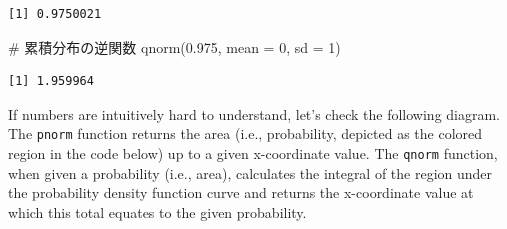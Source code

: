 \documentclass[
  a4paper,
]{book}
\newenvironment{Shaded}{\begin{snugshade}}{\end{snugshade}}
\newcommand{\AttributeTok}[1]{\textcolor[rgb]{0.40,0.45,0.13}{#1}}
\newcommand{\CommentTok}[1]{\textcolor[rgb]{0.37,0.37,0.37}{#1}}
\newcommand{\DecValTok}[1]{\textcolor[rgb]{0.68,0.00,0.00}{#1}}
\newcommand{\FloatTok}[1]{\textcolor[rgb]{0.68,0.00,0.00}{#1}}
\newcommand{\FunctionTok}[1]{\textcolor[rgb]{0.28,0.35,0.67}{#1}}
\newcommand{\NormalTok}[1]{\textcolor[rgb]{0.00,0.23,0.31}{#1}}
\begin{document}
\begin{verbatim}
[1] 0.9750021
\end{verbatim}

\begin{Shaded}
\begin{Highlighting}[]
\CommentTok{\# 累積分布の逆関数}
\FunctionTok{qnorm}\NormalTok{(}\FloatTok{0.975}\NormalTok{, }\AttributeTok{mean =} \DecValTok{0}\NormalTok{, }\AttributeTok{sd =} \DecValTok{1}\NormalTok{)}
\end{Highlighting}
\end{Shaded}

\begin{verbatim}
[1] 1.959964
\end{verbatim}

If numbers are intuitively hard to understand, let's check the following
diagram. The \texttt{pnorm} function returns the area (i.e.,
probability, depicted as the colored region in the code below) up to a
given x-coordinate value. The \texttt{qnorm} function, when given a
probability (i.e., area), calculates the integral of the region under
the probability density function curve and returns the x-coordinate
value at which this total equates to the given probability.
\end{document}
